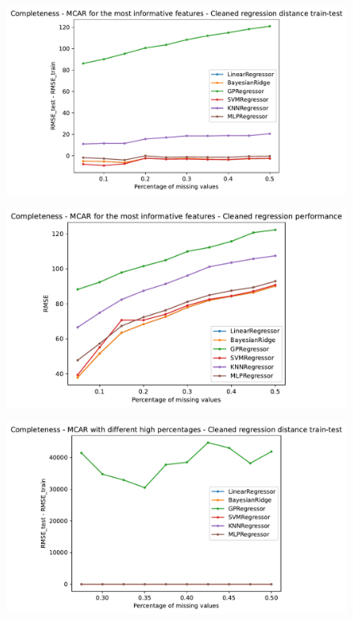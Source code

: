 \documentclass{Configuration_Files/PoliMi3i_thesis}
\begin{document}
\begin{figure}[H]
    \centering
    \includegraphics[scale=0.6]{Images/completeness/12.pdf}
\end{figure}
\begin{figure}[H]
    \centering
    \includegraphics[scale=0.6]{Images/completeness/13.pdf}
\end{figure}
\begin{figure}[H]
    \centering
    \includegraphics[scale=0.6]{Images/completeness/14.pdf}    
\end{figure}
\end{document}
